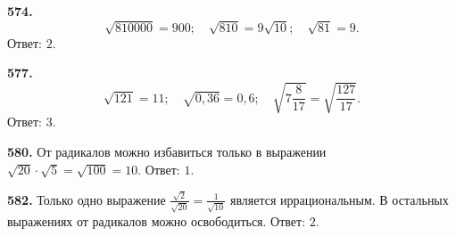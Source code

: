 \textbf{574.} $$\sqrt{810000}=900;\quad \sqrt{810}=9\sqrt{10};\quad \sqrt{81}=9.$$ \newline \null \hspace*{\fill} Ответ: $2$. 

\textbf{577.} $$\sqrt{121}=11;\quad \sqrt{0,36}=0,6;\quad \sqrt{7\frac{8}{17}}=\sqrt{\frac{127}{17}}.$$ \newline \null \hspace*{\fill} \newline \null \hspace*{\fill} Ответ: $3$. 

\textbf{580.} От радикалов можно избавиться только в выражении $\sqrt{20}\cdot\sqrt5=\sqrt{100}=10$. \newline \null \hspace*{\fill} Ответ: $1$.

\textbf{582.} Только одно выражение $\frac{\sqrt2}{\sqrt{20}}=\frac{1}{\sqrt{10}}$ является иррациональным. В остальных выражениях от радикалов можно освободиться. \newline \null \hspace*{\fill} Ответ: $2$.